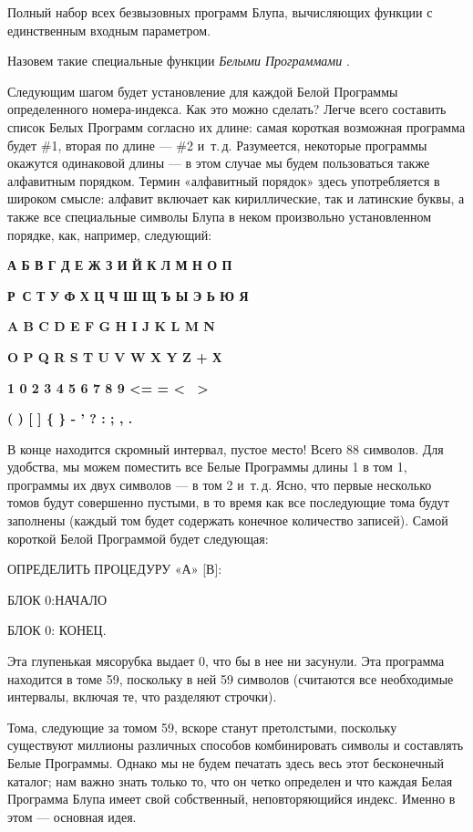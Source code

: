 \documentclass[../main.tex]{subfiles}
\begin{document}
Полный набор всех безвызовных программ Блупа, вычисляющих функции с единственным входным параметром.

Назовем такие специальные функции \emph{Белыми Программами} .

Следующим шагом будет установление для каждой Белой Программы определенного номера-индекса. Как это можно сделать? Легче всего составить список Белых Программ согласно их длине: самая короткая возможная программа будет \#1, вторая по длине --- \#2 и~т.\,д. Разумеется, некоторые программы окажутся одинаковой длины --- в этом случае мы будем пользоваться также алфавитным порядком. Термин «алфавитный порядок» здесь употребляется в широком смысле: алфавит включает как кириллические, так и латинские буквы, а также все специальные символы Блупа в неком произвольно установленном порядке, как, например, следующий:

\textbf{А Б В Г Д Е Ж З И Й К Л М Н О П}

\textbf{Р~С Т У Ф Х Ц Ч Ш Щ Ъ Ы Э Ь Ю Я}

\textbf{A B C D E F G H I J K L M N}

\textbf{O P Q R S T U V W X Y Z + Х}

\textbf{1 0 2 3 4 5 6 7 8 9 \textless= = \textless~ \textgreater{}}

\textbf{( ) {[} {]} \{ \} - ' ? : ; , .}

В конце находится скромный интервал, пустое место! Всего 88 символов. Для удобства, мы можем поместить все Белые Программы длины 1 в том 1, программы их двух символов --- в том 2 и~т.\,д. Ясно, что первые несколько томов будут совершенно пустыми, в то время как все последующие тома будут заполнены (каждый том будет содержать конечное количество записей). Самой короткой Белой Программой будет следующая:

ОПРЕДЕЛИТЬ ПРОЦЕДУРУ «А» {[}В{]}:

БЛОК 0:НАЧАЛО

БЛОК 0: КОНЕЦ.

Эта глупенькая мясорубка выдает 0, что бы в нее ни засунули. Эта программа находится в томе 59, поскольку в ней 59 символов (считаются все необходимые интервалы, включая те, что разделяют строчки).

Тома, следующие за томом 59, вскоре станут претолстыми, поскольку существуют миллионы различных способов комбинировать символы и составлять Белые Программы. Однако мы не будем печатать здесь весь этот бесконечный каталог; нам важно знать только то, что он четко определен и что каждая Белая Программа Блупа имеет свой собственный, неповторяющийся индекс. Именно в этом --- основная идея.
\end{document}
